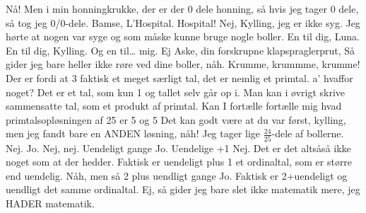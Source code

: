 \documentclass[a4paper,11pt]{article}
\begin{document}
\begin{sketch}
 Nå! Men i min honningkrukke, der er der 0 dele honning, så hvis jeg tager 0 dele, så tog jeg 0/0-dele.
 Bamse, L'Hospital.
 Hospital! Nej, Kylling, jeg er ikke syg.
 Jeg hørte at nogen var syge og som måske kunne bruge nogle boller.
	En til dig, Luna.
	En til dig, Kylling.
	Og en til…  mig.
 Ej Aske, din forskrupne klapspraglerprut, Så gider jeg bare heller ikke røre ved dine boller, nåh.
 Krumme, krummme, krumme!
 Der er fordi at 3 faktisk et meget særligt tal, det er nemlig et primtal.
 a' hvaffor noget?
 Det er et tal, som kun 1 og tallet selv går op i. Man kan i øvrigt skrive sammensatte tal, som et produkt af primtal.
 Kan I fortælle fortælle mig hvad primtalsopløsningen af 25 er
 5 og 5
 Det kan godt være at du var først, kylling, men jeg fandt bare en ANDEN løsning, nåh!
 Jeg tager lige $\frac{24}{25}$-dele af bollerne.
 Nej.
 Jo.
 Nej, nej.
 Uendeligt gange Jo.
 Uendelige +1 Nej.
 Det er det altsåså ikke noget som at der hedder.
 Faktisk er uendeligt plus 1 et ordinaltal, som er større end uendelig.
 Nåh, men så 2 plus uendligt gange Jo.
 Faktisk er 2+uendeligt og uendligt det samme ordinaltal.
 Ej, så gider jeg bare slet ikke matematik mere, jeg HADER matematik.
\end{sketch}
\end{document}
